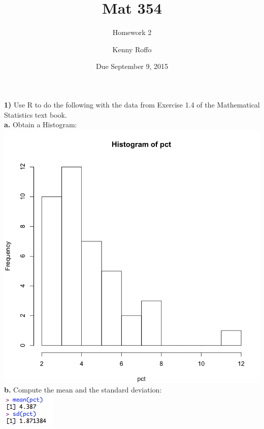 \documentclass{scrartcl}
\title{Mat 354}
\subtitle{Homework 2}
\author{Kenny Roffo}
\date{Due September 9, 2015}
\begin{document}
\maketitle
\textbf{1)} Use R to do the following with the data from Exercise 1.4 of the Mathematical Statistics text book.\\

\textbf{a.} Obtain a Histogram:\\
\includegraphics[keepaspectratio=true, scale=0.2]{1a.png}\\

\textbf{b.} Compute the mean and the standard deviation:\\
\includegraphics[keepaspectratio=true, scale=0.75]{1b.png}\\
\end{document}
